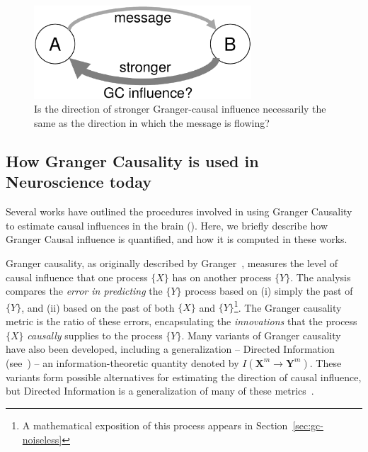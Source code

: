 \documentclass[letterpaper, 10pt, conference]{ieeeconf}
\newcommand{\m}[1]{\mathbf{#1}^m}
\begin{document}
\begin{figure}[htbp] %
	\centering
	\includegraphics[width=3.2in]{gc-vs-message}
	\caption{Is the direction of stronger Granger-causal influence necessarily the same as the direction in which the message is flowing?}
	\label{fig:gc-vs-message}
\end{figure}


\subsection{How Granger Causality is used in Neuroscience today}
\label{sec:gc-used-in-neuroscience}

Several works have outlined the procedures involved in using Granger Causality to estimate causal influences in the brain (\cite{Brovelli2004BetaOscillations, bernasconi2000bidirectional, Ding2000ShortWindow, Roebroeck2005MappingDirected, Bressler2011WienerGranger, Barnett2014MVGC, Ding2006GrangerCausality}). Here, we briefly describe how Granger Causal influence is quantified, and how it is computed in these works.

Granger causality, as originally described by Granger~\cite{Granger1969InvestigatingCausal}, measures the level of causal influence that one process $\{X\}$ has on another process $\{Y\}$. The analysis compares the \emph{error in predicting} the $\{Y\}$ process based on (i) simply the past of $\{Y\}$, and (ii) based on the past of both $\{X\}$ and $\{Y\}$\footnote{A mathematical exposition of this process appears in Section~\ref{sec:gc-noiseless}}. The Granger causality metric is the ratio of these errors, encapsulating the \emph{innovations} that the process $\{X\}$ \emph{causally} supplies to the process $\{Y\}$. Many variants of Granger causality have also been developed, including a generalization -- Directed Information (see~\cite{MasseyCausality, quinn, jiao2013universal}) -- an information-theoretic quantity denoted by $I(\m{X}\to\m{Y})$. These variants form possible alternatives for estimating the direction of causal influence, but Directed Information is a generalization of many of these metrics~\cite{quinn}.
\end{document}
